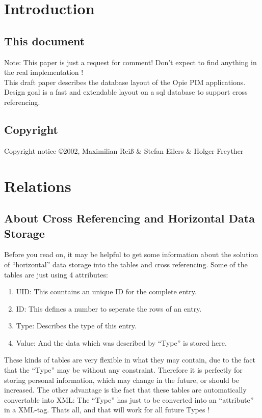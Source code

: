 \pagebreak
\section{Introduction}

\subsection{This document}

Note: This paper is just a request for comment! Don't expect to find anything in the real implementation !
\\
This draft paper describes the database layout of the Opie PIM applications.
Design goal is a fast and extendable layout on a sql database to support cross referencing.


\subsection{Copyright}

Copyright notice
\copyright 2002, Maximilian Rei{\ss} \& Stefan Eilers \& Holger Freyther

\pagebreak
\section{Relations}
\subsection{About Cross Referencing and Horizontal Data Storage}
Before you read on, it may be helpful to get some information about the solution of ``horizontal'' data storage into the tables and cross referencing.
Some of the tables are just using 4 attributes:
\begin{enumerate}
\item UID: This countains an unique ID for the complete entry.
\item ID: This defines a number to seperate the rows of an entry.
\item Type: Describes the type of this entry.
\item Value: And the data which was described by ``Type'' is stored here.
\end{enumerate}

These kinds of tables are very flexible in what they may contain, due to the fact that the ``Type'' may be without any constraint. Therefore it is perfectly for storing personal information, which may change in the future, or should be increased. The other advantage is the fact that these tables are automatically convertable into XML:
The ``Type'' has just to be converted into an ``attribute'' in a XML-tag. Thats all, and that will work for all future Types !


